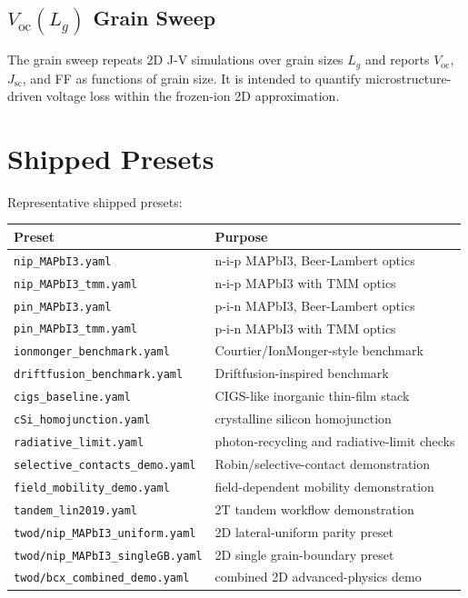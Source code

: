 \documentclass[
  11pt,
  american,
]{report}
\begin{document}
\hypertarget{v_mathrmocl_g-grain-sweep}{%
\section{\texorpdfstring{\(V_\mathrm{oc}(L_g)\) Grain
Sweep}{V\_\textbackslash mathrm\{oc\}(L\_g) Grain Sweep}}\label{v_mathrmocl_g-grain-sweep}}

The grain sweep repeats 2D J-V simulations over grain sizes \(L_g\) and
reports \(V_\mathrm{oc}\), \(J_\mathrm{sc}\), and FF as functions of
grain size. It is intended to quantify microstructure-driven voltage
loss within the frozen-ion 2D approximation.

\hypertarget{shipped-presets}{%
\chapter{Shipped Presets}\label{shipped-presets}}

Representative shipped presets:

\begin{longtable}[]{@{}ll@{}}
\toprule
Preset & Purpose \\
\midrule
\endhead
\texttt{nip\_MAPbI3.yaml} & n-i-p MAPbI3, Beer-Lambert optics \\
\texttt{nip\_MAPbI3\_tmm.yaml} & n-i-p MAPbI3 with TMM optics \\
\texttt{pin\_MAPbI3.yaml} & p-i-n MAPbI3, Beer-Lambert optics \\
\texttt{pin\_MAPbI3\_tmm.yaml} & p-i-n MAPbI3 with TMM optics \\
\texttt{ionmonger\_benchmark.yaml} & Courtier/IonMonger-style
benchmark \\
\texttt{driftfusion\_benchmark.yaml} & Driftfusion-inspired benchmark \\
\texttt{cigs\_baseline.yaml} & CIGS-like inorganic thin-film stack \\
\texttt{cSi\_homojunction.yaml} & crystalline silicon homojunction \\
\texttt{radiative\_limit.yaml} & photon-recycling and radiative-limit
checks \\
\texttt{selective\_contacts\_demo.yaml} & Robin/selective-contact
demonstration \\
\texttt{field\_mobility\_demo.yaml} & field-dependent mobility
demonstration \\
\texttt{tandem\_lin2019.yaml} & 2T tandem workflow demonstration \\
\texttt{twod/nip\_MAPbI3\_uniform.yaml} & 2D lateral-uniform parity
preset \\
\texttt{twod/nip\_MAPbI3\_singleGB.yaml} & 2D single grain-boundary
preset \\
\texttt{twod/bcx\_combined\_demo.yaml} & combined 2D advanced-physics
demo \\
\bottomrule
\end{longtable}
\end{document}
